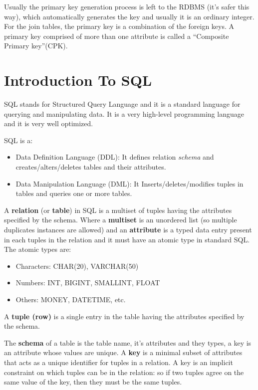 \documentclass[a4page, 11pt]{article}
\begin{document}
Usually the primary key generation process is left to the RDBMS (it's safer this way), which automatically generates the key and usually it is an ordinary integer.
For the join tables, the primary key is a combination of the foreign keys. A primary key comprised of more than one attribute is called a ``Composite Primary key''(CPK).

\section{Introduction To SQL}
SQL stands for Structured Query Language and it is a standard language for querying and manipulating data. It is a very high-level programming language and it is very well optimized.


SQL is a:
\begin{itemize}[noitemsep]
	\item Data Definition Language (DDL):\newline
	 It defines relation \textit{schema} and creates/alters/deletes tables and their attributes.
	\item Data Manipulation Language (DML):\newline
	It Inserts/deletes/modifies tuples in tables and queries one or more tables.
\end{itemize}

A \textbf{relation} (or \textbf{table}) in SQL is a multiset of tuples having the attributes specified by the schema. Where a \textbf{multiset} is an unordered list (so multiple duplicates instances are allowed) and an \textbf{attribute} is a typed data entry present in each tuples in the relation and it must have an atomic type in standard SQL. The atomic types are:
\begin{itemize}
	\item Characters: CHAR(20), VARCHAR(50)
	\item Numbers: INT, BIGINT, SMALLINT, FLOAT
	\item Others: MONEY, DATETIME, etc.
\end{itemize}
A \textbf{tuple (row)} is a single entry in the table having the attributes specified by the schema.

The \textbf{schema} of a table is the table name, it's attributes and they types, a key is an attribute whose values are unique. A \textbf{key} is a minimal subset of attributes that acts as a unique identifier for tuples in a relation. A key is an implicit constraint on which tuples can be in the relation: so if two tuples agree on the same value of the key, then they must be the same tuples. 
\end{document}
